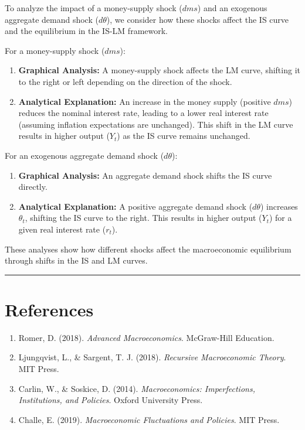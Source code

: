 \documentclass{article}
\begin{document}
To analyze the impact of a money-supply shock (\( dms \)) and an exogenous aggregate demand shock (\( d\theta \)), we consider how these shocks affect the IS curve and the equilibrium in the IS-LM framework.

For a money-supply shock (\( dms \)):
\begin{enumerate}
    \item \textbf{Graphical Analysis:} A money-supply shock affects the LM curve, shifting it to the right or left depending on the direction of the shock.
    \item \textbf{Analytical Explanation:} An increase in the money supply (positive \( dms \)) reduces the nominal interest rate, leading to a lower real interest rate (assuming inflation expectations are unchanged). This shift in the LM curve results in higher output (\( Y_t \)) as the IS curve remains unchanged.
\end{enumerate}

For an exogenous aggregate demand shock (\( d\theta \)):
\begin{enumerate}
    \item \textbf{Graphical Analysis:} An aggregate demand shock shifts the IS curve directly.
    \item \textbf{Analytical Explanation:} A positive aggregate demand shock (\( d\theta \)) increases \( \theta_t \), shifting the IS curve to the right. This results in higher output (\( Y_t \)) for a given real interest rate (\( r_t \)).
\end{enumerate}

These analyses show how different shocks affect the macroeconomic equilibrium through shifts in the IS and LM curves.

\noindent\rule{\linewidth}{1pt}

\section{References}
\begin{enumerate}
    \item Romer, D. (2018). \textit{Advanced Macroeconomics}. McGraw-Hill Education.
    \item Ljungqvist, L., \& Sargent, T. J. (2018). \textit{Recursive Macroeconomic Theory}. MIT Press.
    \item Carlin, W., \& Soskice, D. (2014). \textit{Macroeconomics: Imperfections, Institutions, and Policies}. Oxford University Press.
    \item Challe, E. (2019). \textit{Macroeconomic Fluctuations and Policies}. MIT Press.
\end{enumerate}
\end{document}
